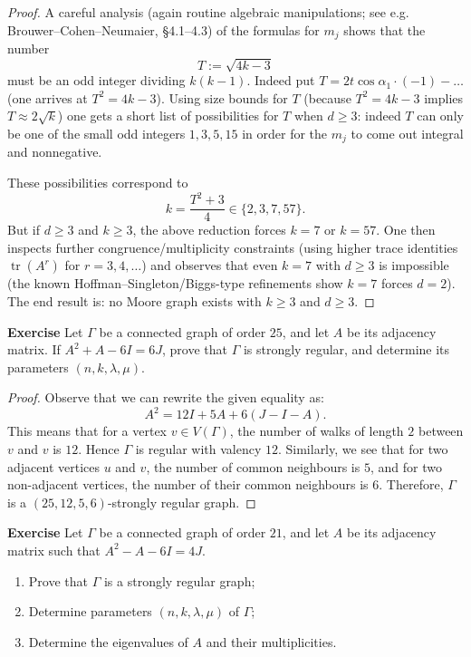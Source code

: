 \documentclass[12pt,a4paper,openany]{book}
\begin{document}
\begin{proof}
A careful analysis (again routine algebraic manipulations; see e.g.
Brouwer–Cohen–Neumaier, §4.1–4.3) of the formulas for $m_j$ shows that
the number
\[
T := \sqrt{4k-3}
\]
must be an odd integer dividing $k(k-1)$. Indeed put
$T=2t\cos\alpha_1\cdot(-1) - \ldots$ (one arrives at $T^2=4k-3$). Using
size bounds for $T$ (because $T^2=4k-3$ implies $T\approx 2\sqrt{k}$) one
gets a short list of possibilities for $T$ when $d\ge3$: indeed $T$ can
only be one of the small odd integers $1,3,5,15$ in order for the $m_j$
to come out integral and nonnegative.

These possibilities correspond to
\[
k = \frac{T^2+3}{4} \in \{2,3,7,57\}.
\]
But if $d\ge3$ and $k\ge3$, the above reduction forces $k=7$ or $k=57$.
One then inspects further congruence/multiplicity constraints (using
higher trace identities $\operatorname{tr}(A^r)$ for $r=3,4,\dots$) and
observes that even $k=7$ with $d\ge3$ is impossible (the known
Hoffman–Singleton/Biggs-type refinements show $k=7$ forces $d=2$). The
end result is: no Moore graph exists with $k\ge3$ and $d\ge3$.
\end{proof}






\bigskip\noindent\textbf{Exercise}
Let $\Gamma$ be a connected graph of order $25$, and let $A$ be its adjacency matrix. If $A^2 + A - 6I = 6J$, prove that $\Gamma$ is strongly regular, and determine its parameters $(n, k, \lambda, \mu)$.


\begin{proof}
Observe that we can rewrite the given equality as:
\[
A^2 = 12 I + 5 A + 6 (J - I - A).
\]
This means that for a vertex $v \in V(\Gamma)$, the number of walks of length $2$ between $v$ and $v$ is $12$. Hence $\Gamma$ is regular with valency $12$. Similarly, we see that for two adjacent vertices $u$ and $v$, the number of common neighbours is $5$, and for two non-adjacent vertices, the number of their common neighbours is $6$. Therefore, $\Gamma$ is a $(25, 12, 5, 6)$-strongly regular graph.
\end{proof}

\bigskip\noindent\textbf{Exercise}
Let $\Gamma$ be a connected graph of order $21$, and let $A$ be its adjacency matrix such that $A^2 - A - 6I = 4J$.

\begin{enumerate}
    \item Prove that $\Gamma$ is a strongly regular graph;
    \item Determine parameters $(n, k, \lambda, \mu)$ of $\Gamma$;
    \item Determine the eigenvalues of $A$ and their multiplicities.
\end{enumerate}
\end{document}
